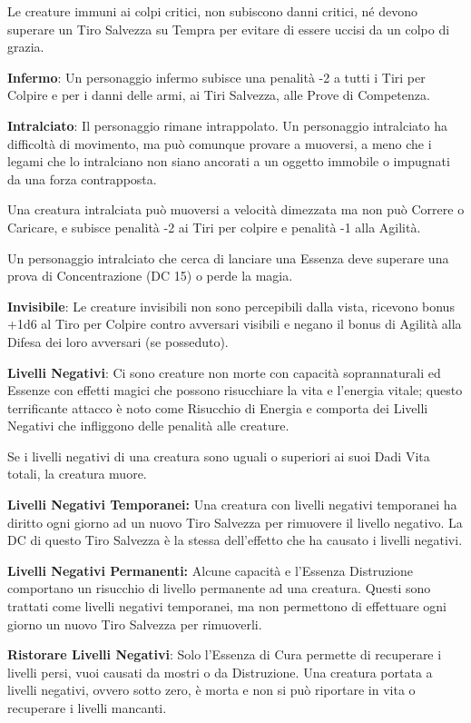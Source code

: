 \documentclass[a4paper,11pt,twoside,openany]{book}
\begin{document}
Le creature immuni ai colpi critici, non subiscono danni critici, né devono superare un Tiro Salvezza su Tempra per evitare di essere uccisi da un colpo di grazia.

\textbf{Infermo}: Un personaggio infermo subisce una penalità -2 a tutti i Tiri per Colpire e per i danni delle armi, ai Tiri Salvezza, alle Prove di Competenza.

\textbf{Intralciato}: Il personaggio rimane intrappolato. Un personaggio intralciato ha difficoltà di movimento, ma può comunque provare a muoversi, a meno che i legami che lo intralciano non siano ancorati a un oggetto immobile o impugnati da una forza contrapposta.

Una creatura intralciata può muoversi a velocità dimezzata ma non può Correre o Caricare, e subisce penalità -2 ai Tiri per colpire e penalità -1 alla Agilità.

Un personaggio intralciato che cerca di lanciare una Essenza deve superare una prova di Concentrazione (DC 15) o perde la magia.

\textbf{Invisibile}: Le creature invisibili non sono percepibili dalla vista, ricevono bonus +1d6 al Tiro per Colpire contro avversari visibili e negano il bonus di Agilità alla Difesa dei loro avversari (se posseduto).

\textbf{Livelli Negativi}: Ci sono creature non morte con capacità soprannaturali ed Essenze con effetti magici che possono risucchiare la vita e l'energia vitale; questo terrificante attacco è noto come Risucchio di Energia e comporta dei Livelli Negativi che infliggono delle penalità alle creature.

Se i livelli negativi di una creatura sono uguali o superiori ai suoi Dadi Vita totali, la creatura muore.

\textbf{Livelli Negativi Temporanei:} Una creatura con livelli negativi temporanei ha diritto ogni giorno ad un nuovo Tiro Salvezza per rimuovere il livello negativo. La DC di questo Tiro Salvezza è la stessa dell'effetto che ha causato i livelli negativi.

\textbf{Livelli Negativi Permanenti:} Alcune capacità e l'Essenza Distruzione comportano un risucchio di livello permanente ad una creatura. Questi sono trattati come livelli negativi temporanei, ma non permettono di effettuare ogni giorno un nuovo Tiro Salvezza per rimuoverli.

\textbf{Ristorare Livelli Negativi}: Solo l'Essenza di Cura permette di recuperare i livelli persi, vuoi causati da mostri o da Distruzione. Una creatura portata a livelli negativi, ovvero sotto zero, è morta e non si può riportare in vita o recuperare i livelli mancanti.
\end{document}
